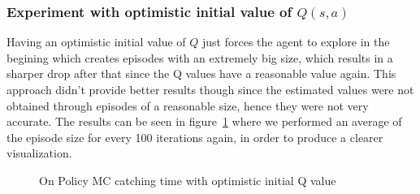 \documentclass[paper=a4, fontsize=11pt]{scrartcl}
\numberwithin{equation}{section}		%
\numberwithin{figure}{section}			%
\numberwithin{table}{section}				%
\begin{document}
\subsubsection*{Experiment with optimistic initial value of $Q(s,a)$}
Having an optimistic initial value of $Q$ just forces the agent to explore in the begining which creates episodes with an extremely big size, which results in a sharper drop after that since the Q values have a reasonable value again. This approach didn't provide better results though since the estimated values were not obtained through episodes of a reasonable size, hence they were not very accurate. The results can be seen in figure~\ref{figure:differentFixEpsilonOnOpt} where we performed an average of the episode size for every 100 iterations again, in order to produce a clearer visualization.
\begin{figure}[h] \centering
\caption{On Policy MC catching time with optimistic initial Q value} \label{figure:differentFixEpsilonOnOpt}
\end{figure}
\end{document}
